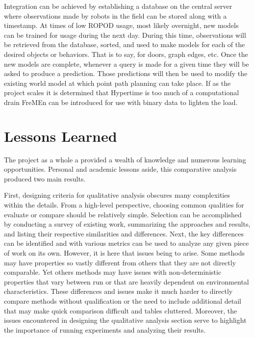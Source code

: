     Integration can be achieved by establishing a database on the central server
    where observations made by robots in the field can be stored along
    with a timestamp. At times of low ROPOD usage, most likely overnight, new
    models can be trained for usage during the next day. During this time,
    observations will be retrieved from the database, sorted, and used to make
    models for each of the desired objects or behaviors. That is to say, for
    doors, graph edges, etc. Once the new models are complete, whenever a query is
    made for a given time they will be asked to produce a prediction.
    Those predictions will then be used to modify the existing world model at
    which point path planning can take place. If as the project scales it is
    determined that Hypertime is too much of a computational drain FreMEn
    can be introduced for use with binary data to lighten the load. \\


    \section{ Lessons Learned }

    The project as a whole a provided a wealth of knowledge and
    numerous learning opportunities. Personal and academic lessons aside, this
    comparative analysis produced two main results.

    First, designing criteria for qualitative analysis obscures many complexities
    within the details. From a high-level perspective, choosing common
    qualities for evaluate or compare should be relatively simple.
    Selection can be accomplished by conducting a survey of existing work,
    summarizing the approaches and results, and listing their respective
    similarities and differences. Next, the key differences can be
    identified and with various metrics can be used to analyze any given piece of
    work on its own. However, it is here that issues being to arise. Some methods
    may have properties so vastly different from others that they are not
    directly comparable. Yet others methods may have issues with non-deterministic
    properties that vary between run or that are heavily dependent on environmental
    characteristics. These differences and issues make it much harder to directly
    compare methods without qualification or the need to include additional detail
    that may make quick comparison difficult and tables cluttered. Moreover,
    the issues encountered in designing the qualitative analysis section serve
    to highlight the importance of running experiments and analyzing their results. \\


